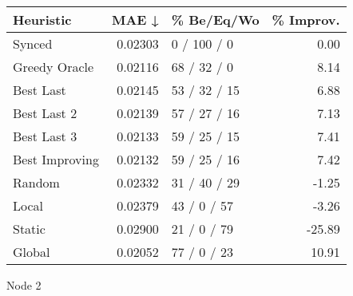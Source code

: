 \begin{tabular}{lrlr}
\toprule
\textbf{Heuristic} & \textbf{MAE ↓} & \textbf{\% Be/Eq/Wo} & \textbf{\% Improv.} \\
\midrule
            Synced &        0.02303 &          0 / 100 / 0 &                0.00 \\
     Greedy Oracle &        0.02116 &          68 / 32 / 0 &                8.14 \\
         Best Last &        0.02145 &         53 / 32 / 15 &                6.88 \\
       Best Last 2 &        0.02139 &         57 / 27 / 16 &                7.13 \\
       Best Last 3 &        0.02133 &         59 / 25 / 15 &                7.41 \\
    Best Improving &        0.02132 &         59 / 25 / 16 &                7.42 \\
            Random &        0.02332 &         31 / 40 / 29 &               -1.25 \\
             Local &        0.02379 &          43 / 0 / 57 &               -3.26 \\
            Static &        0.02900 &          21 / 0 / 79 &              -25.89 \\
            Global &        0.02052 &          77 / 0 / 23 &               10.91 \\
\bottomrule
\end{tabular}
\caption{Node 2}
\label{tab:non_lr05_le2_bs4_2}
